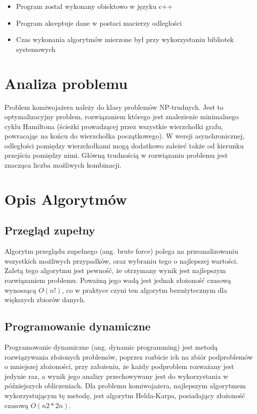 \documentclass{article}
\begin{document}
\begin{itemize}
\item Program został wykonany obiektowo w języku c++
\item Program akceptuje dane w postaci macierzy odległości
\item Czas wykonania algorytmów mierzone był przy wykorzystaniu
bibliotek systemowych
\end{itemize}

\section{Analiza problemu}

Problem komiwojażera należy do klasy problemów NP-trudnych. Jest to
optymalizacyjny problem, rozwiązaniem którego jest znalezienie minimalnego cyklu Hamiltona
(ścieżki prowadzącej przez wszystkie wierzchołki grafu, powracając na końcu do wierzchołka
początkowego). W wersji asynchronicznej, odległości pomiędzy
wierzchołkami mogą dodatkowo zależeć także od kierunku przejścia pomiędzy nimi. Główną
trudnością w rozwiązaniu problemu jest znacząca liczba możliwych kombinacji.


\section{Opis Algorytmów}

\subsection{Przegląd zupełny}

Algorytm przeglądu zupełnego (ang. brute force) polega na przeanalizowaniu wszystkich
możliwych przypadków, oraz wybraniu tego o najlepszej wartości. Zaletą tego algorytmu jest pewność,
że otrzymany wynik jest najlepszym rozwiązaniem problemu. Poważną jego wadą jest jednak
złożoność czasową wynoszącą $O(n!)$, co w praktyce czyni ten algorytm bezużytecznym dla większych
zbiorów danych.

\subsection{Programowanie dynamiczne}

Programowanie dynamiczne (ang. dynamic programming) jest metodą rozwiązywania złożonych
problemów, poprzez rozbicie ich na zbiór podproblemów o mniejszej złożoności, przy założeniu, że
każdy podproblem rozważany jest jedynie raz, a wynik jego analizy przechowywany jest do
wykorzystania w późniejszych obliczeniach. Dla problemu komiwojażera, najlepszym algorytmem
wykorzystującym tę metodę, jest algorytm Helda-Karpa, posiadający złożoność czasową $O(n2 * 2n)$.\\\\
\end{document}
